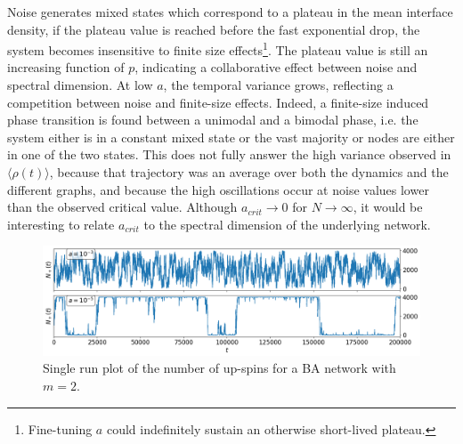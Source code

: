 Noise generates mixed states which correspond to a plateau in the mean interface density, if the plateau value is reached before the fast exponential drop, the system becomes insensitive to finite size effects\footnote{ Fine-tuning $a$ could indefinitely sustain an otherwise short-lived plateau.}. The plateau value is still an increasing function of $p$, indicating a collaborative effect between noise and spectral dimension.
At low $a$, the temporal variance grows, reflecting a competition between noise and finite-size effects.
Indeed, a finite-size induced phase transition is found between a unimodal and a bimodal phase, i.e. the system either is in a constant mixed state or the vast majority or nodes are either in one of the two states. This does not fully answer the high variance observed in $\langle \rho (t)\rangle$, because that trajectory was an average over both the dynamics and the different graphs, and because the high oscillations occur at noise values lower than the observed critical value. Although $a_{crit} \to 0$ for $N\to \infty$, it would be interesting to relate $a_{crit}$ to the spectral dimension of the underlying network. 
\begin{figure}[htbp]
  \centering
  \includegraphics[width=15cm,keepaspectratio]{images/finite_size_noise.png}
  \caption{Single run plot of the number of up-spins for a BA network with $m=2$.}
  \label{fig:yourlabel}
\end{figure}

\newpage
